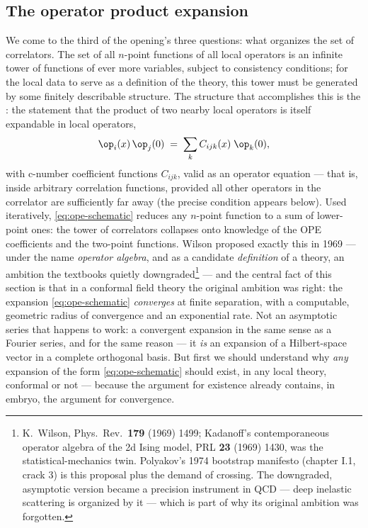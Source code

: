 \subsection{The operator product expansion}
\label{sec:ope}

We come to the third of the opening's three questions: what organizes the
set of correlators. The set of all $n$-point functions of all local
operators is an infinite tower of functions of ever more variables, subject
to consistency conditions; for the local data to serve as a definition of
the theory, this tower must be generated by some finitely describable
structure. The structure that accomplishes this is the : the statement that the product of two nearby local
operators is itself expandable in local operators,
\begin{equation}
\op_i(x)\,\op_j(0) \;=\; \sum_{k} C_{ijk}(x)\; \op_k(0),
\label{eq:ope-schematic}
\end{equation}
with c-number coefficient functions $C_{ijk}$, valid as an operator equation
--- that is, inside arbitrary correlation functions, provided all other
operators in the correlator are sufficiently far away (the precise condition
appears below). Used iteratively, \eqref{eq:ope-schematic} reduces any
$n$-point function to a sum of lower-point ones: the tower of correlators
collapses onto knowledge of the OPE coefficients and the two-point functions.
Wilson proposed exactly this in 1969 --- under the name \emph{operator
algebra}, and as a candidate \emph{definition} of a theory, an ambition the
textbooks quietly downgraded\footnote{K.~Wilson, Phys.\ Rev.\ \textbf{179}
(1969) 1499; Kadanoff's contemporaneous operator algebra of the 2d Ising
model, PRL \textbf{23} (1969) 1430, was the statistical-mechanics twin.
Polyakov's 1974 bootstrap manifesto (chapter I.1, crack 3) is this proposal
plus the demand of crossing. The downgraded, asymptotic version became a
precision instrument in QCD --- deep inelastic scattering is organized by it
--- which is part of why its original ambition was forgotten.} --- and the
central fact of this section is that in a conformal field theory the original
ambition was right: the expansion \eqref{eq:ope-schematic} \emph{converges} at
finite separation, with a computable, geometric radius of convergence and an
exponential rate. Not an asymptotic series that happens to work: a convergent
expansion in the same sense as a Fourier series, and for the same reason ---
it \emph{is} an expansion of a Hilbert-space vector in a complete orthogonal
basis. But first we should understand why \emph{any} expansion of the form
\eqref{eq:ope-schematic} should exist, in any local theory, conformal or not
--- because the argument for existence already contains, in embryo, the
argument for convergence.

